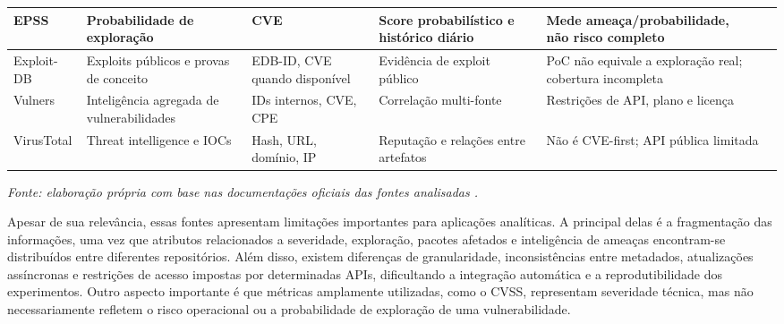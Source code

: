 \begin{table}[htbp]
{{\begin{tabular}{|>{\RaggedRight\arraybackslash}p{3.0cm}|>{\RaggedRight\arraybackslash}p{3.2cm}|>{\RaggedRight\arraybackslash}p{3.2cm}|>{\RaggedRight\arraybackslash}p{3.4cm}|>{\RaggedRight\arraybackslash}p{4.8cm}|}
                \hline
                EPSS                      & Probabilidade de exploração                                   & CVE                           & Score probabilístico e histórico diário                                    & \shortstack[l]{Mede ameaça/probabilidade,                                                               \\não risco completo}                                                           \\
                \hline
                Exploit-DB                & Exploits públicos e provas de conceito                        & EDB-ID, CVE quando disponível & Evidência de exploit público                                               & PoC não equivale a exploração real; cobertura incompleta                                                \\
                \hline
                Vulners                   & Inteligência agregada de vulnerabilidades                     & IDs internos, CVE, CPE        & Correlação multi-fonte                                                     & Restrições de API, plano e licença                                                                      \\
                \hline
                VirusTotal                & Threat intelligence e IOCs                                    & Hash, URL, domínio, IP        & Reputação e relações entre artefatos                                       & Não é CVE-first; API pública limitada                                                                   \\
                \hline
            \end{tabular}%
        }}

    \vspace{0.2cm}
    {\footnotesize\textit{Fonte: elaboração própria com base nas documentações oficiais das fontes analisadas \cite{cve_program_overview,nvd_home,github_advisory_database_docs,github_advisory_database_repo,osv_database,osv_schema,cisa_kev_catalog,first_epss,exploitdb,vulners,vulners_api_docs,virustotal_api_v3}.}}

\end{table}

Apesar de sua relevância, essas fontes apresentam limitações importantes para aplicações analíticas. A principal delas é a fragmentação das informações, uma vez que atributos relacionados a severidade, exploração, pacotes afetados e inteligência de ameaças encontram-se distribuídos entre diferentes repositórios. Além disso, existem diferenças de granularidade, inconsistências entre metadados, atualizações assíncronas e restrições de acesso impostas por determinadas APIs, dificultando a integração automática e a reprodutibilidade dos experimentos. Outro aspecto importante é que métricas amplamente utilizadas, como o CVSS, representam severidade técnica, mas não necessariamente refletem o risco operacional ou a probabilidade de exploração de uma vulnerabilidade.

